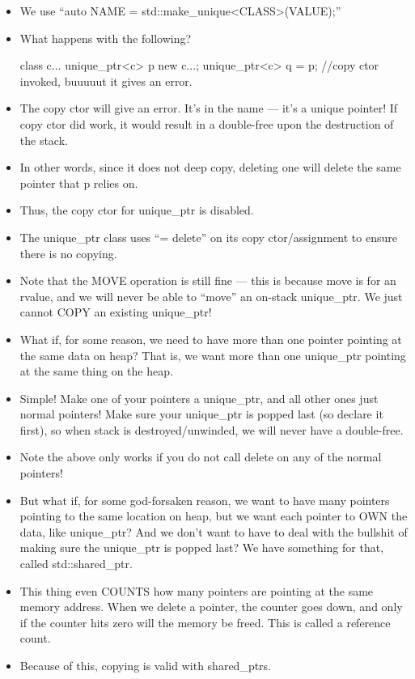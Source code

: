\documentclass{article}
\begin{document}
\begin{itemize}
\item We use ``auto NAME = std::make\_unique<CLASS>(VALUE);''
\item What happens with the following?
\begin{itemize}
class c{...}
unique\_ptr<c> p {new c{...}};
unique\_ptr<c> q = p; //copy ctor invoked, buuuuut it gives an error.
\end{itemize}
\item The copy ctor will give an error.  It's in the name --- it's a unique pointer!  If copy ctor did work, it would result in a double-free upon the destruction of the stack.
\item In other words, since it does not deep copy, deleting one will delete the same pointer that p relies on.
\item Thus, the copy ctor for unique\_ptr is disabled.
\item The unique\_ptr class uses ``= delete'' on its copy ctor/assignment to ensure there is no copying.
\item Note that the MOVE operation is still fine --- this is because move is for an rvalue, and we will never be able to ``move'' an on-stack unique\_ptr.  We just cannot COPY an existing unique\_ptr!
\item What if, for some reason, we need to have more than one pointer pointing at the same data on heap?  That is, we want more than one unique\_ptr pointing at the same thing on the heap.
\item Simple!  Make one of your pointers a unique\_ptr, and all other ones just normal pointers!  Make sure your unique\_ptr is popped last (so declare it first), so when stack is destroyed/unwinded, we will never have a double-free.
\item Note the above only works if you do not call delete on any of the normal pointers!  
\item But what if, for some god-forsaken reason, we want to have many pointers pointing to the same location on heap, but we want each pointer to OWN the data, like unique\_ptr?  And we don't want to have to deal with the bullshit of making sure the unique\_ptr is popped last?  We have something for that, called std::shared\_ptr.
\item This thing even COUNTS how many pointers are pointing at the same memory address.  When we delete a pointer, the counter goes down, and only if the counter hits zero will the memory be freed.  This is called a reference count.
\item Because of this, copying is valid with shared\_ptrs.

\end{itemize}
\end{document}

